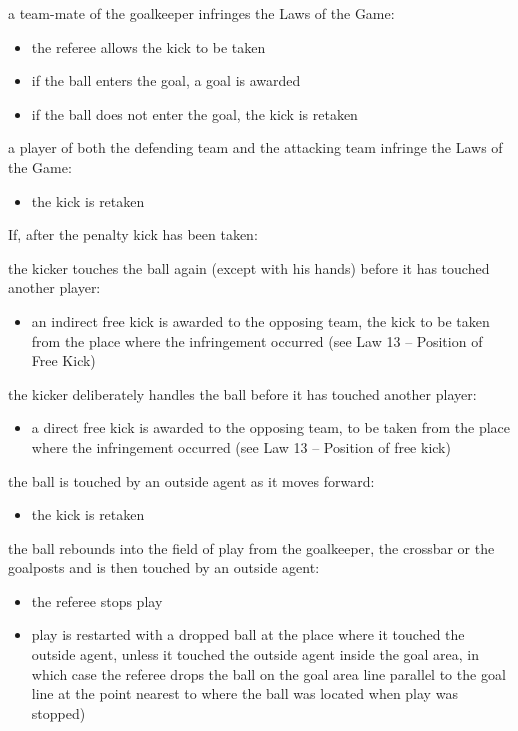 {\bigskip

a team-mate of the goalkeeper infringes the Laws of the Game: 

\begin{itemize}
\item the referee allows the kick to be taken 
\item if the ball enters the goal, a goal is awarded 
\item if the ball does not enter the goal, the kick is retaken 
\end{itemize}

\bigskip

a player of both the defending team and the attacking team infringe the
Laws of the Game:

\begin{itemize}
\item the kick is retaken
\end{itemize}

\bigskip

If, after the penalty kick has been taken:

the kicker touches the ball again (except with his hands) before it has
touched another player:

\begin{itemize}
\item an indirect free kick is awarded to the opposing team, the kick to be
taken from the place where the infringement occurred (see Law 13 --
Position of Free Kick)
\end{itemize}

\bigskip

the kicker deliberately handles the ball before it has touched another
player:

\begin{itemize}
\item a direct free kick is awarded to the opposing team, to be taken from the
place where the infringement occurred (see Law 13 -- Position of free
kick)
\end{itemize}

\bigskip

the ball is touched by an outside agent as it moves forward:

\begin{itemize}
\item the kick is retaken
\end{itemize}

\bigskip

the ball rebounds into the field of play from the goalkeeper, the
crossbar or the goalposts and is then touched by an outside agent:

\begin{itemize}
\item the referee stops play
\item play is restarted with a dropped ball at the place where it touched the
outside agent, unless it touched the outside agent inside the goal area,
in which case the referee drops the ball on the goal area line parallel
to the goal line at the point nearest to where the ball was located
when play was stopped)
\end{itemize}
}
\color{black}
